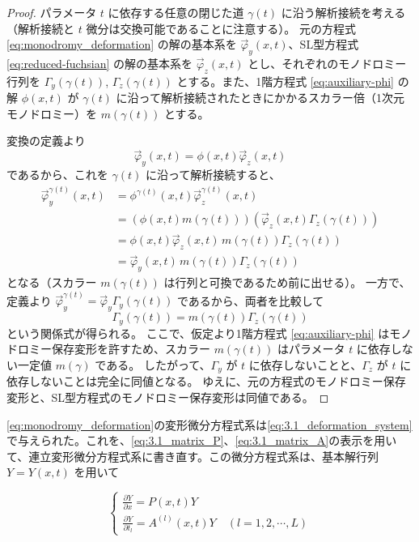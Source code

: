 \begin{proof}
パラメータ $t$ に依存する任意の閉じた道 $\gamma(t)$ に沿う解析接続を考える（解析接続と $t$ 微分は交換可能であることに注意する）。
元の方程式 \eqref{eq:monodromy_deformation} の解の基本系を $\vec{\varphi}_y(x,t)$、SL型方程式 \eqref{eq:reduced-fuchsian} の解の基本系を $\vec{\varphi}_z(x,t)$ とし、それぞれのモノドロミー行列を $\Gamma_{y}(\gamma(t))$, $\Gamma_{z}(\gamma(t))$ とする。また、1階方程式 \eqref{eq:auxiliary-phi} の解 $\phi(x,t)$ が $\gamma(t)$ に沿って解析接続されたときにかかるスカラー倍（1次元モノドロミー）を $m(\gamma(t))$ とする。

変換の定義より
\[
\vec{\varphi}_y(x,t) = \phi(x,t) \vec{\varphi}_z(x,t)
\]
であるから、これを $\gamma(t)$ に沿って解析接続すると、
\begin{align*}
\vec{\varphi}_y^{\gamma(t)}(x,t) &= \phi^{\gamma(t)}(x,t) \vec{\varphi}_z^{\gamma(t)}(x,t) \\
&= \left( \phi(x,t) m(\gamma(t)) \right) \left( \vec{\varphi}_z(x,t) \Gamma_{z}(\gamma(t)) \right) \\
&= \phi(x,t) \vec{\varphi}_z(x,t) \, m(\gamma(t)) \Gamma_{z}(\gamma(t)) \\
&= \vec{\varphi}_y(x,t) \, m(\gamma(t)) \Gamma_{z}(\gamma(t))
\end{align*}
となる（スカラー $m(\gamma(t))$ は行列と可換であるため前に出せる）。
一方で、定義より $\vec{\varphi}_y^{\gamma(t)} = \vec{\varphi}_y \Gamma_{y}(\gamma(t))$ であるから、両者を比較して
\[
\Gamma_{y}(\gamma(t)) = m(\gamma(t)) \Gamma_{z}(\gamma(t))
\]
という関係式が得られる。
ここで、仮定より1階方程式 \eqref{eq:auxiliary-phi} はモノドロミー保存変形を許すため、スカラー $m(\gamma(t))$ はパラメータ $t$ に依存しない一定値 $m(\gamma)$ である。
したがって、$\Gamma_{y}$ が $t$ に依存しないことと、$\Gamma_{z}$ が $t$ に依存しないことは完全に同値となる。
ゆえに、元の方程式のモノドロミー保存変形と、SL型方程式のモノドロミー保存変形は同値である。
\end{proof}
\eqref{eq:monodromy_deformation}の変形微分方程式系は\eqref{eq:3.1_deformation_system}で与えられた。これを、\eqref{eq:3.1_matrix_P}、\eqref{eq:3.1_matrix_A}の表示を用いて、連立変形微分方程式系に書き直す。この微分方程式系は、基本解行列 $Y=Y(x,t)$ を用いて

\begin{equation}
  \begin{cases}
    \displaystyle \frac{\partial Y}{\partial x} = P(x,t)Y \\
    \displaystyle \frac{\partial Y}{\partial t_l} = A^{(l)}(x,t)Y \quad (l=1,2,\cdots,L)
  \end{cases}
\end{equation}

